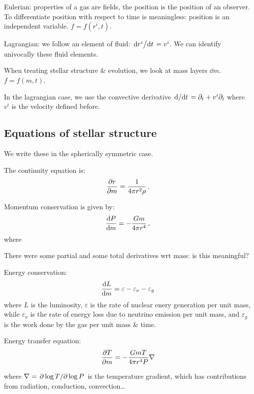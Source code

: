 \documentclass[main.tex]{subfiles}
\begin{document}
Eulerian: properties of a gas are fields, the position is the position of an observer.
To differentiate position with respect to time is meaningless: position is an independent variable. \(f = f(r^i, t)\).

Lagrangian: we follow an element of fluid: \(\dv*{r^i}{t} = v^i \). We can identify univocally these fluid elements.

When treating stellar structure \& evolution, we look at mass layers \(\dd{m}\).  \(f = f(m, t)\).

In the lagrangian case, we use the convective derivative \(\dv*{}{t} = \partial_t + v^i \partial_i\) where \(v^i\) is the velocity defined before.

\subsection{Equations of stellar structure}

We write these in the spherically symmetric case.

The continuity equation is:
%
\begin{equation}
    \pdv{r}{m} = \frac{1}{4 \pi r^2 \rho} \,.
\end{equation}

Momentum conservation is given by:
%
\begin{equation}
    \dv{P}{m} = - \frac{Gm}{4 \pi r^4}\,,
\end{equation}
%
where

\begin{greenbox}
There were some partial and some total derivatives wrt mass: is this meaningful?
\end{greenbox}

Energy conservation:
%
\begin{equation}
    \dv{L}{m} = \varepsilon - \varepsilon_\nu - \varepsilon_g
\end{equation}
%
where \(L\) is the luminosity, \(\varepsilon\) is the rate of nuclear enery generation per unit mass, while \(\varepsilon_\nu\) is the rate of energy loss due to neutrino emission per unit mass, and \(\varepsilon_g \) is the work done by the gas per unit mass \& time.

Energy transfer equation:
%
\begin{equation}
    \pdv{T}{m} = - \frac{GmT}{4 \pi r^4 P} \nabla
\end{equation}

where \(\nabla = \pdv*{\log T}{\log P} \) is the temperature gradient, which has contributions from radiation, conduction, convection\dots
\end{document}
